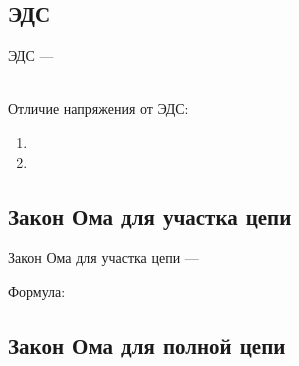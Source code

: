 \subsection{ЭДС}
ЭДС --- \hrulefill

\hrulefill
\\
Отличие напряжения от ЭДС:
\begin{enumerate}
    \item \hrulefill

    \hrulefill
    \item \hrulefill

    \hrulefill
\end{enumerate}

\subsection{Закон Ома для участка цепи}

Закон Ома для участка цепи --- \hrulefill

\hrulefill

\hrulefill

Формула:



\subsection{Закон Ома для полной цепи}

